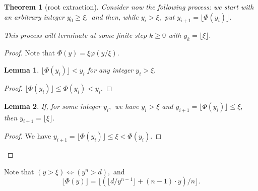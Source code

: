 \documentclass[a4paper,12pt]{article}
\newtheorem{theorem}{Theorem}
\newtheorem{lemma}{Lemma}
\newcommand{\floor}[1] {\lfloor #1 \rfloor}
\begin{document}
\begin{theorem}[root extraction]
    Consider now the following process:
    we start with an arbitrary integer $y_0 \ge \xi,$ and then,
    while $y_i > \xi,$ put $y_{i+1} = \floor{\Phi(y_i)}.$

    This process will terminate at some finite step $k \ge 0$ with $y_k = \floor{\xi}.$
\end{theorem}
\begin{proof}

Note that $\Phi(y) = \xi \varphi(y / \xi).$

\begin{lemma}
    $\floor{\Phi(y_i)} < y_i$ for any integer $y_i > \xi.$
\end{lemma}
\begin{proof}
    $\floor{\Phi(y_i)} \le \Phi(y_i) < y_i.$
\end{proof}

\begin{lemma}
    If, for some integer $y_i,$ we have $y_i > \xi$ and $y_{i+1} = \floor{\Phi(y_i)} \le \xi,$ then
    $y_{i+1} = \floor{\xi}.$
\end{lemma}
\begin{proof}
    We have $y_{i+1} = \floor{\Phi(y_i)} \le \xi < \Phi(y_i).$
\end{proof}

\end{proof}

Note that $(y > \xi) \Leftrightarrow (y^n > d),$
and $$\floor{\Phi(y)} = \floor{ ( \floor{ d / {y}^{n-1} } + (n-1) \cdot y ) / n }.$$
\end{document}
